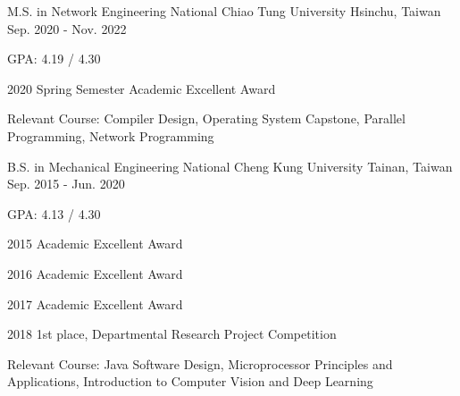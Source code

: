 

\begin{cventries}

  \cventry
    {M.S. in Network Engineering} %
    {National Chiao Tung University} %
    {Hsinchu, Taiwan} %
    {Sep. 2020 - Nov. 2022} %
    {
      \begin{cvitems} %
        \item {GPA: 4.19 / 4.30}
        \item {2020 Spring Semester Academic Excellent Award}
        \item {Relevant Course: Compiler Design, Operating System Capstone, Parallel Programming, Network Programming}
      \end{cvitems}
    }

  \cventry
    {B.S. in Mechanical Engineering} %
    {National Cheng Kung University} %
    {Tainan, Taiwan} %
    {Sep. 2015 - Jun. 2020} %
    {
      \vspace{14pt}
      \begin{cvitems} %
        \item {GPA: 4.13 / 4.30}
        \item {2015 Academic Excellent Award}
        \item {2016 Academic Excellent Award}
        \item {2017 Academic Excellent Award}
        \item {2018 1st place, Departmental Research Project Competition}
        \item {Relevant Course: Java Software Design, Microprocessor Principles and Applications, Introduction to Computer Vision and Deep Learning}
      \end{cvitems}
    }

\end{cventries}
